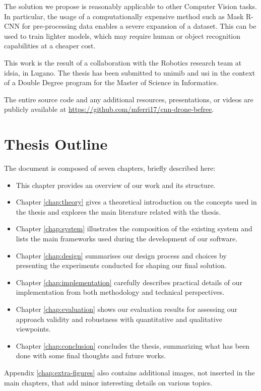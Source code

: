 The solution we propose is reasonably applicable to other Computer Vision tasks. In particular, the usage of a computationally expensive method such as Mask R-CNN for pre-processing data enables a severe expansion of a dataset. This can be used to train lighter models, which may require human or object recognition capabilities at a cheaper cost.

\clearpage

This work is the result of a collaboration with the Robotics research team at \gls{idsia}, in Lugano. The thesis has been submitted to \gls{unimib} and \gls{usi} in the context of a Double Degree program for the Master of Science in Informatics.

The entire source code and any additional resources, presentations, or videos are publicly available at \url{https://github.com/mferri17/cnn-drone-befree}.




\section*{Thesis Outline}
\label{sec:outline}

The document is composed of seven chapters, briefly described here:

\begin{itemize}
	\item This chapter provides an overview of our work and its structure.
	\item Chapter \ref{chap:theory} gives a theoretical introduction on the concepts used in the thesis and explores the main literature related with the thesis.
	\item Chapter \ref{chap:system} illustrates the composition of the existing system and lists the main frameworks used during the development of our software.
	\item Chapter \ref{chap:design} summarises our design process and choices by presenting the experiments conducted for shaping our final solution.
	\item Chapter \ref{chap:implementation} carefully describes practical details of our implementation from both methodology and technical perspectives.
	\item Chapter \ref{chap:evaluation} shows our evaluation results for assessing our approach validity and robustness with quantitative and qualitative viewpoints.
	\item Chapter \ref{chap:conclusion} concludes the thesis, summarizing what has been done with some final thoughts and future works.
\end{itemize}

Appendix \ref{chap:extra-figures} also contains additional images, not inserted in the main chapters, that add minor interesting details on various topics.





